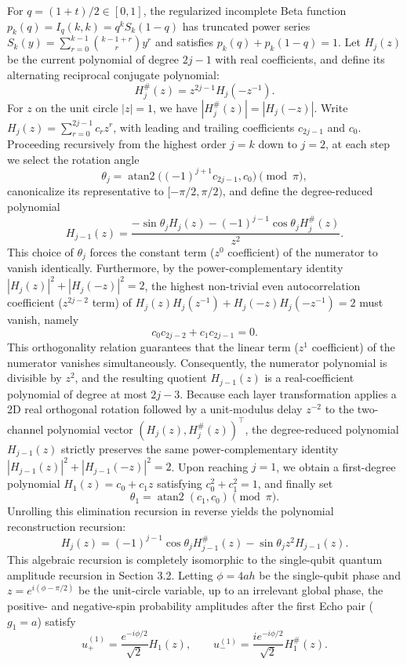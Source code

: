 \documentclass{article}
\theoremstyle{plain}
\theoremstyle{definition}
\begin{document}
For $q=(1+t)/2\in[0,1]$, the regularized incomplete Beta function $p_k(q)=I_q(k,k)=q^kS_k(1-q)$ has truncated power series $S_k(y)=\sum_{r=0}^{k-1}\binom{k-1+r}{r}y^r$ and satisfies $p_k(q)+p_k(1-q)=1$. Let $H_j(z)$ be the current polynomial of degree $2j-1$ with real coefficients, and define its alternating reciprocal conjugate polynomial:
\[
H_j^\#(z)=z^{2j-1}H_j(-z^{-1}).
\]
For $z$ on the unit circle $|z|=1$, we have $|H_j^\#(z)|=|H_j(-z)|$. Write $H_j(z)=\sum_{r=0}^{2j-1}c_rz^r$, with leading and trailing coefficients $c_{2j-1}$ and $c_0$. Proceeding recursively from the highest order $j=k$ down to $j=2$, at each step we select the rotation angle
\[
\theta_j=\operatorname{atan2}\big((-1)^{j+1}c_{2j-1},c_0\big)\pmod\pi,
\]
canonicalize its representative to $[-\pi/2,\pi/2)$, and define the degree-reduced polynomial
\[
H_{j-1}(z)=
\frac{-\sin\theta_jH_j(z)
-(-1)^{j-1}\cos\theta_jH_j^\#(z)}{z^2}.
\]
This choice of $\theta_j$ forces the constant term ($z^0$ coefficient) of the numerator to vanish identically. Furthermore, by the power-complementary identity $|H_j(z)|^2+|H_j(-z)|^2=2$, the highest non-trivial even autocorrelation coefficient ($z^{2j-2}$ term) of $H_j(z)H_j(z^{-1})+H_j(-z)H_j(-z^{-1})=2$ must vanish, namely
\[
c_0c_{2j-2}+c_1c_{2j-1}=0.
\]
This orthogonality relation guarantees that the linear term ($z^1$ coefficient) of the numerator vanishes simultaneously. Consequently, the numerator polynomial is divisible by $z^2$, and the resulting quotient $H_{j-1}(z)$ is a real-coefficient polynomial of degree at most $2j-3$. Because each layer transformation applies a 2D real orthogonal rotation followed by a unit-modulus delay $z^{-2}$ to the two-channel polynomial vector $(H_j(z), H_j^\#(z))^\top$, the degree-reduced polynomial $H_{j-1}(z)$ strictly preserves the same power-complementary identity $|H_{j-1}(z)|^2+|H_{j-1}(-z)|^2=2$. Upon reaching $j=1$, we obtain a first-degree polynomial $H_1(z)=c_0+c_1z$ satisfying $c_0^2+c_1^2=1$, and finally set
\[
\theta_1=\operatorname{atan2}(c_1,c_0)\pmod\pi.
\]
Unrolling this elimination recursion in reverse yields the polynomial reconstruction recursion:
\[
H_j(z)=(-1)^{j-1}\cos\theta_jH_{j-1}^\#(z)
-\sin\theta_jz^2H_{j-1}(z).
\]
This algebraic recursion is completely isomorphic to the single-qubit quantum amplitude recursion in Section 3.2. Letting $\phi=4ah$ be the single-qubit phase and $z=e^{i(\phi-\pi/2)}$ be the unit-circle variable, up to an irrelevant global phase, the positive- and negative-spin probability amplitudes after the first Echo pair ($g_1=a$) satisfy
\[
u_+^{(1)}=\frac{e^{-i\phi/2}}{\sqrt2}H_1(z),\qquad
u_-^{(1)}=\frac{i e^{-i\phi/2}}{\sqrt2}H_1^\#(z).
\]
\end{document}
